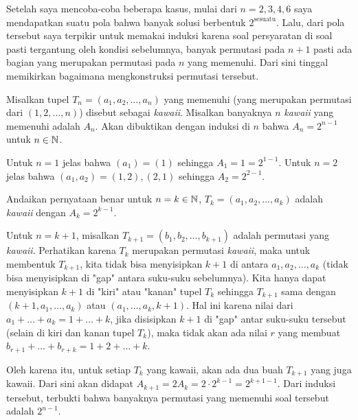 

\begin{motivasi}
    Setelah saya mencoba-coba beberapa kasus, mulai dari $n=2,3,4,6$ saya mendapatkan suatu pola bahwa banyak solusi berbentuk $2^\text{sesuatu}$. Lalu, dari pola tersebut saya terpikir untuk memakai induksi karena soal persyaratan di soal pasti tergantung oleh kondisi sebelumnya, banyak permutasi pada $n+1$ pasti ada bagian yang merupakan permutasi pada $n$ yang memenuhi. Dari sini tinggal memikirkan bagaimana mengkonstruksi permutasi tersebut.
\end{motivasi}
\begin{solusi}
    Misalkan tupel $T_n=(a_1,a_2,\dots,a_n)$ yang memenuhi (yang merupakan permutasi dari $(1,2,\dots,n)$) disebut sebagai \textit{kawaii}. Misalkan banyaknya $n$ \textit{kawaii} yang memenuhi adalah $A_n$. Akan dibuktikan dengan induksi di $n$ bahwa $A_n=2^{n-1}$ untuk $n \in \mathbb N$.

    Untuk $n=1$ jelas bahwa $(a_1)=(1)$ sehingga $A_1=1=2^{1-1}$. Untuk $n=2$ jelas bahwa $(a_1,a_2) = (1,2), (2,1)$ sehingga $A_2=2^{2-1}$. 
    
    Andaikan pernyataan benar untuk $n=k \in \mathbb N$, $T_k=(a_1,a_2,\dots,a_k)$ adalah \textit{kawaii} dengan $A_k = 2^{k-1}$. 
    
    Untuk $n=k+1$, misalkan $T_{k+1}=(b_1,b_2,\dots,b_{k+1})$ adalah permutasi yang \textit{kawaii}. Perhatikan karena $T_k$ merupakan permutasi \textit{kawaii}, maka untuk membentuk $T_{k+1}$, kita tidak bisa menyisipkan $k+1$ di antara $a_1,a_2,\dots,a_k$ (tidak bisa menyisipkan di "gap" antara suku-suku sebelumnya). Kita hanya dapat menyisipkan $k+1$ di "kiri" atau "kanan" tupel $T_k$ sehingga $T_{k+1}$ sama dengan $(k+1,a_1,\dots,a_k)$ atau $(a_1,\dots,a_k,k+1)$.  Hal ini karena nilai dari $a_1+\dots+a_k = 1+\dots+k$, jika disisipkan $k+1$ di "gap" antar suku-suku tersebut (selain di kiri dan kanan tupel $T_k$), maka tidak akan ada nilai $r$ yang membuat $b_{r+1}+\dots+b_{r+k}=1+2+\dots+k$.
    
    Oleh karena itu, untuk setiap $T_k$ yang kawaii, akan ada dua buah $T_{k+1}$ yang juga kawaii. Dari sini akan didapat $A_{k+1}=2A_k = 2\cdot 2^{k-1} = 2^{k+1 -1}$. Dari induksi tersebut, terbukti bahwa banyaknya permutasi yang memenuhi soal tersebut adalah $2^{n-1}$.
\end{solusi}